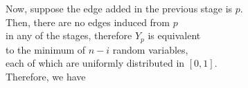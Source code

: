 \documentclass[preview]{standalone}
\begin{document}
\begin{center}
Now, suppose the edge added in the previous stage is $p$.\\
Then, there are no edges induced from $p$\\
in any of the stages, therefore $Y_p$ is equivalent\\
to the minimum of $n - i$ random variables,\\
each of which are uniformly distributed in $[0, 1]$.\\
Therefore, we have
\end{center}
\end{document}
